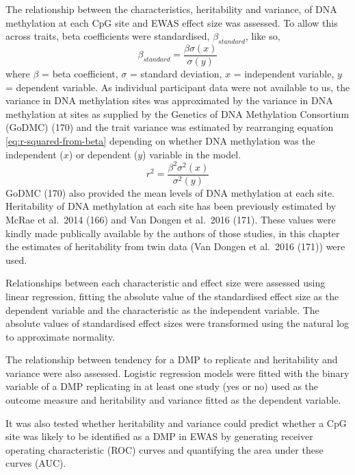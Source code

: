 \documentclass[11pt,twoside]{bristolthesis}
\begin{document}
The relationship between the characteristics, heritability and variance, of DNA methylation at each CpG site and EWAS effect size was assessed. To allow this across traits, beta coefficients were standardised, \(\beta_{standard}\), like so,
\begin{equation}
    \beta_{standard} = \frac{\beta\sigma(x)} {\sigma(y)}
    \label{eq:standardised-beta-coeffs}
\end{equation}
where \(\beta\) = beta coefficient, \(\sigma\) = standard deviation, \(x\) = independent variable, \(y\) = dependent variable. As individual participant data were not available to us, the variance in DNA methylation sites was approximated by the variance in DNA methylation at sites as supplied by the Genetics of DNA Methylation Consortium (GoDMC) (170) and the trait variance was estimated by rearranging equation \eqref{eq:r-squared-from-beta} depending on whether DNA methylation was the independent (\(x\)) or dependent (\(y\)) variable in the model.
\begin{equation}
    r^2 = \frac{\beta^2\sigma^2(x)} {\sigma^2(y)}
    \label{eq:r-squared-from-beta}
\end{equation}
GoDMC (170) also provided the mean levels of DNA methylation at each site. Heritability of DNA methylation at each site has been previously estimated by McRae et al.~2014 (166) and Van Dongen et al.~2016 (171). These values were kindly made publically available by the authors of those studies, in this chapter the estimates of heritability from twin data (Van Dongen et al.~2016 (171)) were used.

Relationships between each characteristic and effect size were assessed using linear regression, fitting the absolute value of the standardised effect size as the dependent variable and the characteristic as the independent variable. The absolute values of standardised effect sizes were transformed using the natural log to approximate normality.

The relationship between tendency for a DMP to replicate and heritability and variance were also assessed. Logistic regression models were fitted with the binary variable of a DMP replicating in at least one study (yes or no) used as the outcome measure and heritability and variance fitted as the dependent variable.

It was also tested whether heritability and variance could predict whether a CpG site was likely to be identified as a DMP in EWAS by generating receiver operating characteristic (ROC) curves and quantifying the area under these curves (AUC).
\end{document}
